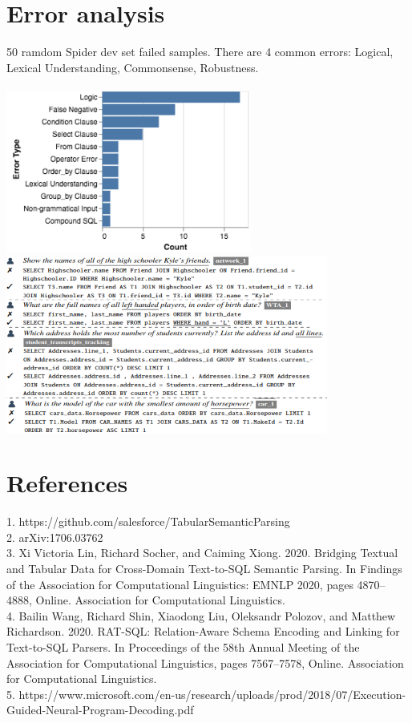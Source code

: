\documentclass[10pt,a4paper]{article}
\begin{document}
\section{Error analysis}
50 ramdom Spider dev set failed samples. There are 4 common errors: Logical, Lexical Understanding, Commonsense, Robustness.\\\\
\includegraphics[scale=1.2]{error}\\
\includegraphics[scale=1.2]{error2}
\section{References}
1. https://github.com/salesforce/TabularSemanticParsing \\
2. arXiv:1706.03762 \\
3. Xi Victoria Lin, Richard Socher, and Caiming Xiong. 2020. Bridging Textual and Tabular Data for Cross-Domain Text-to-SQL Semantic Parsing. In Findings of the Association for Computational Linguistics: EMNLP 2020, pages 4870–4888, Online. Association for Computational Linguistics.\\
4. Bailin Wang, Richard Shin, Xiaodong Liu, Oleksandr Polozov, and Matthew Richardson. 2020. RAT-SQL: Relation-Aware Schema Encoding and Linking for Text-to-SQL Parsers. In Proceedings of the 58th Annual Meeting of the Association for Computational Linguistics, pages 7567–7578, Online. Association for Computational Linguistics.\\
5. https://www.microsoft.com/en-us/research/uploads/prod/2018/07/Execution-Guided-Neural-Program-Decoding.pdf
\end{document}
